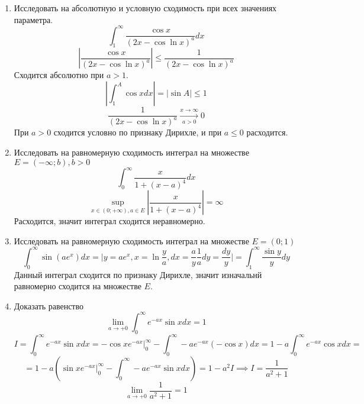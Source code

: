 \documentclass{article}
\begin{document}
\begin{large}
\begin{enumerate}
\item Исследовать на абсолютную и условную сходимость при всех значениях параметра.
$$ \int_1^\infty \frac{\cos x}{(2x - \cos \ln x)^a} dx $$
$$ \left| \frac{\cos x}{(2x - \cos \ln x)^a} \right| \leq \frac{1}{(2x - \cos \ln x)^a} $$
Сходится абсолютно при $a > 1$.
$$ \left| \int_1^A \cos x dx \right| = | \sin A | \leq 1 $$
$$ \frac{1}{(2x - \cos \ln x)^a} \xrightarrow[a>0]{x\to\infty} 0 $$
При $a > 0$ сходится условно по признаку Дирихле, и при $a \leq 0$ расходится.

\item Исследовать на равномерную сходимость интеграл на множестве $ E = (-\infty; b), b>0$
$$ \int_0^\infty \frac{x}{1 + (x - a)^4} dx $$
$$ \sup_{x\in (0;+\infty), a \in E} \left| \frac{x}{1 + (x - a)^4} \right| = \infty $$
Расходится, значит интеграл сходится неравномерно.

\item Исследовать на равномерную сходимость интеграл на множестве $ E = (0; 1)$
$$ \int_0^\infty \sin (ae^x) dx = \Big| y = ae^x, x = \ln \frac{y}{a}, dx = \frac{a}{y} \frac{1}{a} dy = \frac{dy}{y} \Big| = \int_1^\infty \frac{\sin y}{y} dy $$
Данный интеграл сходится по признаку Дирихле, значит изначальнй равномерно сходится на множестве $E$.

\item Доказать равенство
$$ \lim_{a \to +0} \int_0^\infty e^{-ax} \sin x dx = 1 $$
$$ I = \int_0^\infty e^{-ax} \sin x dx = -\cos x e^{-ax} \Big|_0^\infty - \int_0^\infty -a e^{-ax} (-\cos x) dx = 1 - a\int_0^\infty e^{-ax} \cos x dx = $$
$$ = 1 - a \left(\sin x e^{-ax} \Big|_0^\infty - \int_0^\infty -a e^{-ax} \sin x dx \right) = 1 - a^2 I \implies I = \frac{1}{a^2 + 1}  $$
$$ \lim_{a \to +0} \frac{1}{a^2+1} = 1 $$


\end{enumerate}
\end{large}
\end{document}
